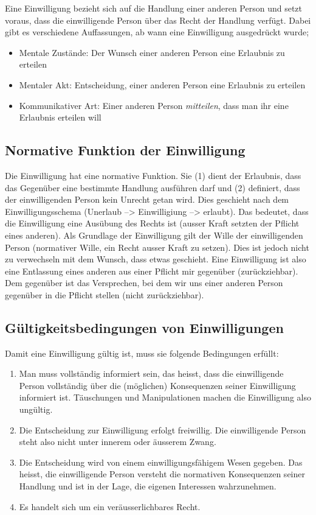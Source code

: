 \documentclass[../main.tex]{subfiles}
\begin{document}
Eine Einwilligung bezieht sich auf die Handlung einer anderen Person und setzt voraus, dass die einwilligende Person über das Recht der Handlung verfügt. Dabei gibt es verschiedene Auffassungen, ab wann eine Einwilligung ausgedrückt wurde;
\begin{itemize}
	\item Mentale Zustände: Der Wunsch einer anderen Person eine Erlaubnis zu erteilen
	\item Mentaler Akt: Entscheidung, einer anderen Person eine Erlaubnis zu erteilen
	\item Kommunikativer Art: Einer anderen Person \textit{mitteilen}, dass man ihr eine Erlaubnis erteilen will
\end{itemize} 


\subsection{Normative Funktion der Einwilligung}
Die Einwilligung hat eine normative Funktion. Sie (1) dient der Erlaubnis, dass das Gegenüber eine bestimmte Handlung ausführen darf und (2) definiert, dass der einwilligenden Person kein Unrecht getan wird. Dies geschieht nach dem Einwilligungsschema (Unerlaub --> Einwilligiung --> erlaubt). Das bedeutet, dass die Einwilligung eine Ausübung des Rechts ist (ausser Kraft setzten der Pflicht eines anderen). Als Grundlage der Einwilligung gilt der Wille der einwilligenden Person (normativer Wille, ein Recht ausser Kraft zu setzen). Dies ist jedoch nicht zu verwechseln mit dem Wunsch, dass etwas geschieht. Eine Einwilligung ist also eine Entlassung eines anderen aus einer Pflicht mir gegenüber (zurückziehbar). Dem gegenüber ist das Versprechen, bei dem wir uns einer anderen Person gegenüber in die Pflicht stellen (nicht zurückziehbar). 

\subsection{Gültigkeitsbedingungen von Einwilligungen}
Damit eine Einwilligung gültig ist, muss sie folgende Bedingungen erfüllt:
\begin{enumerate}[label=(\alph*)]
	\item Man muss vollständig informiert sein, das heisst, dass die einwilligende Person vollständig über die (möglichen) Konsequenzen seiner Einwilligung informiert ist. Täuschungen und Manipulationen machen die Einwilligung also ungültig. 
	\item Die Entscheidung zur Einwilligung erfolgt freiwillig. Die einwilligende Person steht also nicht unter innerem oder äusserem Zwang. 
	\item Die Entscheidung wird von einem einwilligungsfähigem Wesen gegeben. Das heisst, die einwilligende Person versteht die normativen Konsequenzen seiner Handlung und ist in der Lage, die eigenen Interessen wahrzunehmen. 
	\item Es handelt sich um ein veräusserlichbares Recht. 
\end{enumerate}
\end{document}
